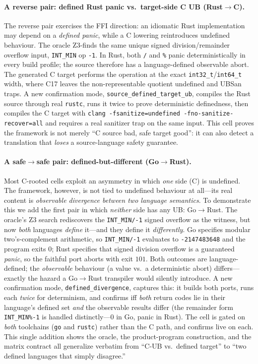 \documentclass[10pt,a4paper]{article}
\begin{document}
\paragraph{A reverse pair: defined Rust panic vs.\ target-side C UB (Rust$\to$C).}
The reverse pair exercises the FFI direction: an idiomatic Rust implementation may
depend on a \emph{defined panic}, while a C lowering reintroduces undefined
behaviour. The oracle Z3-finds the same unique signed division/remainder overflow
input, \texttt{INT\_MIN} op \texttt{-1}. In Rust, both \texttt{/} and \texttt{\%}
panic deterministically in every build profile; the source therefore has a
language-defined observable abort. The generated C target performs the operation
at the exact \texttt{int32\_t}/\texttt{int64\_t} width, where C17 leaves the
non-representable quotient undefined and UBSan traps. A new confirmation mode,
\texttt{source\_defined\_target\_ub}, compiles the Rust source through real
\texttt{rustc}, runs it twice to prove deterministic definedness, then compiles
the C target with \texttt{clang -fsanitize=undefined -fno-sanitize-recover=all}
and requires a real sanitizer trap on the same input. This cell proves the
framework is not merely ``C source bad, safe target good'': it can also detect a
translation that \emph{loses} a source-language safety guarantee.

\paragraph{A safe$\to$safe pair: defined-but-different (Go$\to$Rust).} Most
C-rooted cells exploit an asymmetry in which \emph{one} side (C) is undefined.
The framework, however, is not tied to undefined behaviour at all---its real
content is \emph{observable divergence between two language semantics}. To
demonstrate this we add the first pair in which \emph{neither} side has any UB:
Go$\to$Rust. The oracle's Z3 search rediscovers the \texttt{INT\_MIN/-1} signed
overflow as the witness, but now \emph{both} languages \emph{define} it---and
they define it \emph{differently}. Go specifies modular two's-complement
arithmetic, so \texttt{INT\_MIN/-1} evaluates to \texttt{-2147483648} and the
program exits $0$; Rust specifies that signed division overflow is a guaranteed
\emph{panic}, so the faithful port aborts with exit $101$. Both outcomes are
language-defined; the \emph{observable} behaviour (a value vs.\ a deterministic
abort) differs---exactly the hazard a Go$\to$Rust transpiler would silently
introduce. A new confirmation mode, \texttt{defined\_divergence}, captures this:
it builds both ports, runs each \emph{twice} for determinism, and confirms iff
\emph{both} return codes lie in their language's defined set \emph{and} the
observable results differ (the remainder form \texttt{INT\_MIN\%-1} is handled
distinctly---$0$ in Go, panic in Rust). The cell is gated on \emph{both}
toolchains (\texttt{go} and \texttt{rustc}) rather than the C path, and confirms
live on each. This single addition shows the oracle, the product-program
construction, and the matrix contract all generalize verbatim from
``C-UB vs.\ defined target'' to ``two defined languages that simply disagree.''
\end{document}
